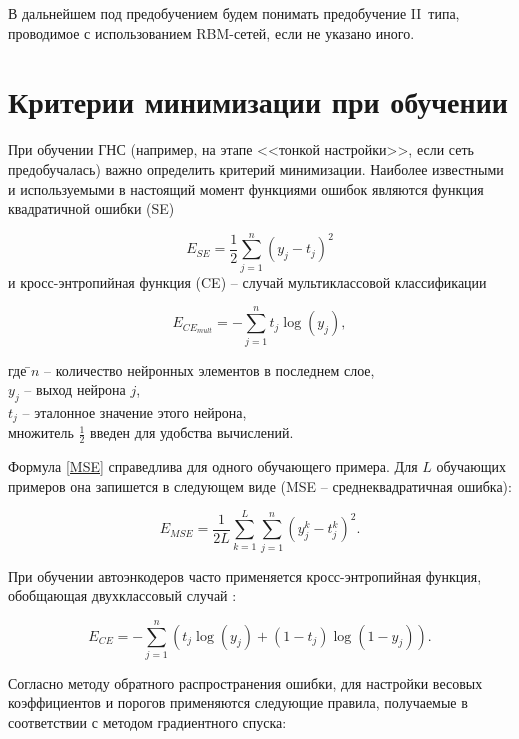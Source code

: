В дальнейшем под предобучением будем понимать предобучение II~типа, проводимое с использованием RBM-сетей, если не указано иного. 

\section{Критерии минимизации при обучении}

При обучении ГНС (например, на этапе <<тонкой настройки>>, если сеть предобучалась) важно определить критерий минимизации. Наиболее известными и используемыми в настоящий момент функциями ошибок являются функция квадратичной ошибки (SE)

\begin{equation}
	\label{MSE}
	E_{SE} = \frac{1}{2}\sum_{j=1}^{n}(y_j - t_j)^2
\end{equation}
и кросс-энтропийная функция (CE) -- случай мультиклассовой классификации

\begin{equation}
	\label{CE_multiclass}
	E_{CE_{mult}} = -\sum_{j=1}^{n}t_j\log(y_j),
\end{equation}
\begin{tabbing}	
где \=$n$ -- количество нейронных элементов в последнем слое,\\
\>$y_j$ -- выход нейрона $j$,\\
\>$t_j$ -- эталонное значение этого нейрона,\\
\>множитель $\frac{1}{2}$ введен для удобства вычислений.
\end{tabbing}

Формула \ref{MSE} справедлива для одного обучающего примера. Для $L$ обучающих примеров она запишется в следующем виде (MSE -- среднеквадратичная ошибка):

\begin{equation}
	\label{MSE_L}
	E_{MSE} = \frac{1}{2L}\sum_{k=1}^{L}\sum_{j=1}^{n}(y_j^k - t_j^k)^2.
\end{equation}

При обучении автоэнкодеров часто применяется кросс-энтропийная функция, обобщающая двухклассовый случай \cite[c.~115]{Amaral2013}:

\begin{equation}
	\label{CE}
	E_{CE} = -\sum_{j=1}^n(t_j\log(y_j) + (1-t_j)\log(1-y_j)).
\end{equation}

Согласно методу обратного распространения ошибки, для настройки весовых коэффициентов и порогов применяются следующие правила, получаемые в соответствии с методом градиентного спуска:

